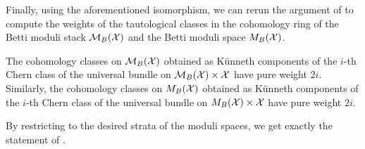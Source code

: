 Finally, using the aforementioned isomorphism, we can rerun the argument of  to compute the weights of the tautological classes in the cohomology ring of the Betti moduli stack $\mathcal{M}_B(\mathcal{X})$ and the Betti moduli space $M_B(\mathcal{X})$.

\begin{thm}
The cohomology classes on $\mathcal{M}_B(\mathcal{X})$ obtained as K\"unneth components of the $i$-th Chern class of the universal bundle on $\mathcal{M}_B(\mathcal{X}) \times \mathcal{X}$ have pure weight $2i$.\\
Similarly, the cohomology classes on $M_B(\mathcal{X})$ obtained as K\"unneth components of the $i$-th Chern class of the universal bundle on $M_B(\mathcal{X}) \times \mathcal{X}$ have pure weight $2i$.
\end{thm}

By restricting to the desired strata of the moduli spaces, we get exactly the statement of .